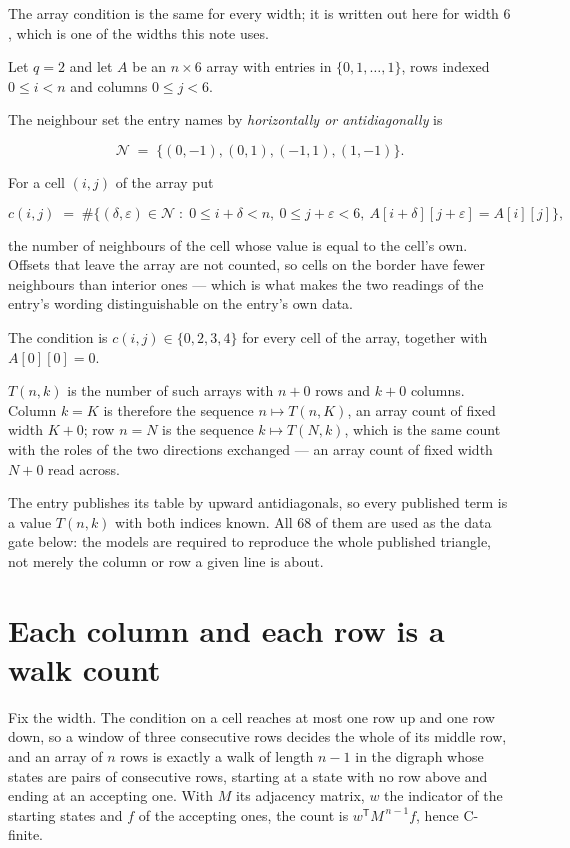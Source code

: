 \documentclass[11pt]{article}
\theoremstyle{definition}
\begin{document}
The array condition is the same for every width; it is written out here for width $6$, which is one of the widths this note uses.

Let $q = 2$ and let $A$ be an $n \times 6$ array with entries in $\{0,1,\dots,1\}$, rows indexed $0 \le i < n$ and columns $0 \le j < 6$.

The neighbour set the entry names by {\itshape horizontally or antidiagonally} is

\[\mathcal{N} \;=\; \{(0,-1), (0,1), (-1,1), (1,-1)\}.\]

For a cell $(i,j)$ of the array put

\[c(i,j) \;=\; \#\bigl\{(\delta,\varepsilon)\in\mathcal{N} \;:\; 0\le i+\delta<n,\ 0\le j+\varepsilon<6,\ A[i+\delta][j+\varepsilon] = A[i][j]\bigr\},\]

the number of neighbours of the cell whose value is equal to the cell's own. Offsets that leave the array are not counted, so cells on the border have fewer neighbours than interior ones --- which is what makes the two readings of the entry's wording distinguishable on the entry's own data.

The condition is $c(i,j) \in \{0, 2, 3, 4\}$ for every cell of the array, together with $A[0][0]=0$.

$T(n,k)$ is the number of such arrays with $n + 0$ rows and $k + 0$ columns. Column $k = K$ is therefore the sequence $n \mapsto T(n,K)$, an array count of fixed width $K + 0$; row $n = N$ is the sequence $k \mapsto T(N,k)$, which is the same count with the roles of the two directions exchanged --- an array count of fixed width $N + 0$ read across.

The entry publishes its table by upward antidiagonals, so every published term is a value $T(n,k)$ with both indices known. All 68 of them are used as the data gate below: the models are required to reproduce the whole published triangle, not merely the column or row a given line is about.

\section{Each column and each row is a walk count}

Fix the width. The condition on a cell reaches at most one row up and one row down, so a window of three consecutive rows decides the whole of its middle row, and an array of $n$ rows is exactly a walk of length $n-1$ in the digraph whose states are pairs of consecutive rows, starting at a state with no row above and ending at an accepting one. With $M$ its adjacency matrix, $w$ the indicator of the starting states and $f$ of the accepting ones, the count is $w^{\mathsf T}M^{\,n-1}f$, hence C-finite.
\end{document}
